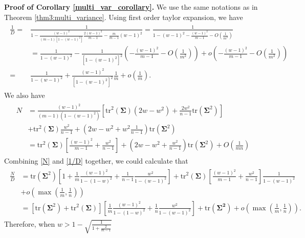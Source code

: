 \noindent
\textbf{Proof of Corollary \ref{multi_var_corollary}.} 
We use the same notations as in Theorem \ref{thm3:multi_variance}. Using first order taylor expansion, we have
\begin{align}
\label{1/D}
\begin{split}
\frac{1}{D}=&\frac{1}{1 
- \frac{(w-1)^2}{(m-1)[1-(w-1)^2]}
\frac{2(w-1)^2}{m-1} 
- \frac{m}{m-1}(w-1)^2}=\frac{1}{1-(w-1)^2-\frac{(w-1)^2}{m-1}-O(\frac{1}{m^2})}\\&=\frac{1}{1-(w-1)^2}-\frac{1}{[1-(w-1)^2]^2}(-\frac{(w-1)^2}{m-1}-O(\frac{1}{m^2}))+o(-\frac{(w-1)^2}{m-1}-O(\frac{1}{m^2}))\\=&
\frac{1}{1-(w-1)^2}+\frac{(w-1)^2}{[1-(w-1)^2]^2}\frac{1}{m}+o(\frac{1}{m}).
\end{split}
\end{align}
We also have
\begin{align}
\label{N}
\begin{split}
N & = 
\frac{(w-1)^2}{(m-1)(1-(w-1)^2)}
\left[
\mathrm{tr}^2(\mathbf{\Sigma})(2w-w^2)
+ \frac{2w^2}{n-1}\mathrm{tr}(\mathbf{\Sigma}^2)
\right]
\\ & + \mathrm{tr}^2(\mathbf{\Sigma})\frac{w^2}{n-1}
+ \left(2w-w^2+w^2\frac{1}{n-1}\right)\mathrm{tr}(\mathbf{\Sigma}^2)\\ &=\mathrm{tr}^2(\mathbf{\Sigma})[\frac{(w-1)^2}{m-1}+\frac{w^2}{n-1}]+(2w-w^2+\frac{w^2}{n-1})\mathrm{tr}(\mathbf{\Sigma}^2)+O(\frac{1}{mn})
\end{split}
\end{align}
Combining \eqref{N} and \eqref{1/D} together, we could calculate that
\begin{align}
\begin{split}
\frac{N}{D}&=\mathrm{tr}(\mathbf{\Sigma}^2)[1+\frac{1}{m}\frac{(w-1)^2}{1-(1-w)^2}+\frac{1}{n-1}\frac{w^2}{1-(w-1)^2} ]+\mathrm{tr}^2(\mathbf{\Sigma})[\frac{(w-1)^2}{m-1}+\frac{w^2}{n-1}]\frac{1}{1-(w-1)^2}\\&+o(\max{(\frac{1}{m},\frac{1}{n})}) \\&=[\mathrm{tr}(\mathbf{\Sigma}^2)+\mathrm{tr}^2(\mathbf{\Sigma})][\frac{1}{m}\frac{(w-1)^2}{1-(1-w)^2}+\frac{1}{n}\frac{w^2}{1-(w-1)^2} ]+\mathrm{tr}(\mathbf{\Sigma^2})+o(\max(\frac{1}{m},\frac{1}{n})). 
\end{split}
\end{align}
Therefore, when $w >1-\sqrt{\frac{1}{1+\frac{2}{m-1}}}$
